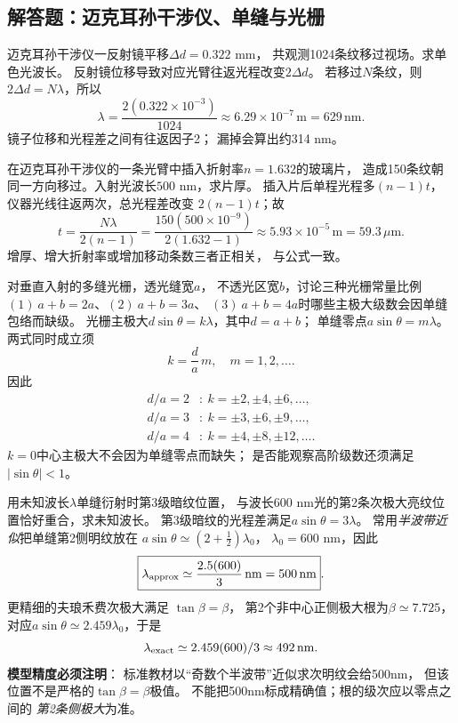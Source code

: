 \subsection{解答题：迈克耳孙干涉仪、单缝与光栅}

\problemtext 迈克耳孙干涉仪一反射镜平移$\Delta d=0.322$ mm，
共观测1024条纹移过视场。求单色光波长。
\workings
反射镜位移导致对应光臂往返光程改变$2\Delta d$。
若移过$N$条纹，则$2\Delta d=N\lambda$，所以
\[
\boxed{\lambda=\frac{2(0.322\times10^{-3})}{1024}
\approx6.29\times10^{-7}\,\mathrm m=629\,\mathrm{nm}}.
\]
\crosscheck 镜子位移和光程差之间有往返因子2；
漏掉会算出约314 nm。

\problemtext 在迈克耳孙干涉仪的一条光臂中插入折射率$n=1.632$的玻璃片，
造成150条纹朝同一方向移过。入射光波长$500$ nm，求片厚。
\workings
插入片后单程光程多$(n-1)t$，
仪器光线往返两次，总光程差改变
$2(n-1)t$；故
\[
\boxed{t=\frac{N\lambda}{2(n-1)}
=\frac{150(500\times10^{-9})}{2(1.632-1)}
\approx5.93\times10^{-5}\,\mathrm m
=59.3\,\mu\mathrm m}.
\]
\crosscheck 增厚、增大折射率或增加移动条数三者正相关，
与公式一致。

\problemtext 对垂直入射的多缝光栅，透光缝宽$a$，
不透光区宽$b$，讨论三种光栅常量比例
$(1)\ a+b=2a$、$(2)\ a+b=3a$、
$(3)\ a+b=4a$时哪些主极大级数会因单缝包络而缺级。
\workings
光栅主极大$d\sin\theta=k\lambda$，其中$d=a+b$；
单缝零点$a\sin\theta=m\lambda$。
两式同时成立须
\[
k=\frac{d}{a}\,m,\quad m=1,2,\ldots.
\]
因此
\[
\boxed{\begin{aligned}
d/a=2&:\ k=\pm2,\pm4,\pm6,\ldots,\\
d/a=3&:\ k=\pm3,\pm6,\pm9,\ldots,\\
d/a=4&:\ k=\pm4,\pm8,\pm12,\ldots.
\end{aligned}}
\]
\crosscheck $k=0$中心主极大不会因为单缝零点而缺失；
是否能观察高阶级数还须满足$|\sin\theta|<1$。

\problemtext 用未知波长$\lambda$单缝衍射时第3级暗纹位置，
与波长$600$ nm光的第2条次极大亮纹位置恰好重合，求未知波长。
\workings
第3级暗纹的光程差满足$a\sin\theta=3\lambda$。
常用\emph{半波带近似}把单缝第2侧明纹放在
$a\sin\theta\simeq(2+\tfrac12)\lambda_0$，
$\lambda_0=600$ nm，因此
\[
\boxed{\lambda_{\rm approx}
\simeq\frac{2.5(600)}{3}\,\mathrm{nm}=500\,\mathrm{nm}}.
\]
更精细的夫琅禾费次极大满足
$\tan\beta=\beta$，
第2个非中心正侧极大根为$\beta\simeq7.725$，
对应$a\sin\theta\simeq2.459\lambda_0$，于是
\[
\lambda_{\rm exact}\simeq2.459(600)/3\approx492\,\mathrm{nm}.
\]
\crosscheck \textbf{模型精度必须注明}：
标准教材以“奇数个半波带”近似求次明纹会给500nm，
但该位置不是严格的$\tan\beta=\beta$极值。
不能把500nm标成精确值；根的级次应以零点之间的
\emph{第2条侧极大}为准。

